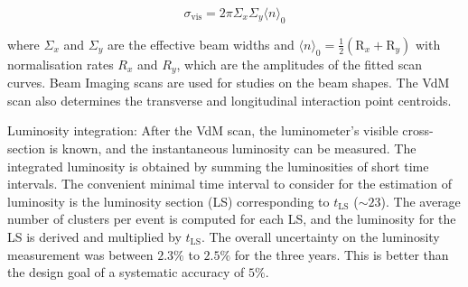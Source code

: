\begin{equation}
  \sigma_{\mathrm{vis}}=2 \pi \Sigma_{x} \Sigma_{y}\langle n\rangle_{0}
\end{equation}

where $\Sigma_{x}$ and $\Sigma_{y}$ are the effective beam widths and $\langle n\rangle_{0}=\frac{1}{2}\left(\mathrm{R}_{x}+\mathrm{R}_{y}\right)$ with normalisation rates $R_x$ and $R_y$, which are the amplitudes of the fitted scan curves. Beam Imaging scans are used for studies on the beam shapes. The VdM scan also determines the transverse and longitudinal interaction point centroids.

Luminosity integration: After the VdM scan, the luminometer's visible cross-section is known, and the instantaneous luminosity can be measured. The integrated luminosity is obtained by summing the luminosities of short time intervals. The convenient minimal time interval to consider for the estimation of luminosity is the luminosity section (LS) corresponding to $t_{\mathrm{LS}}$ ($\sim 23$). The average number of clusters per event is computed for each LS, and the luminosity for the LS is derived and multiplied by $t_{\mathrm{LS}}$. The overall uncertainty on the luminosity measurement was between $2.3\%$ to $2.5\%$ for the three years. This is better than the design goal of a systematic accuracy of $5\%$.
